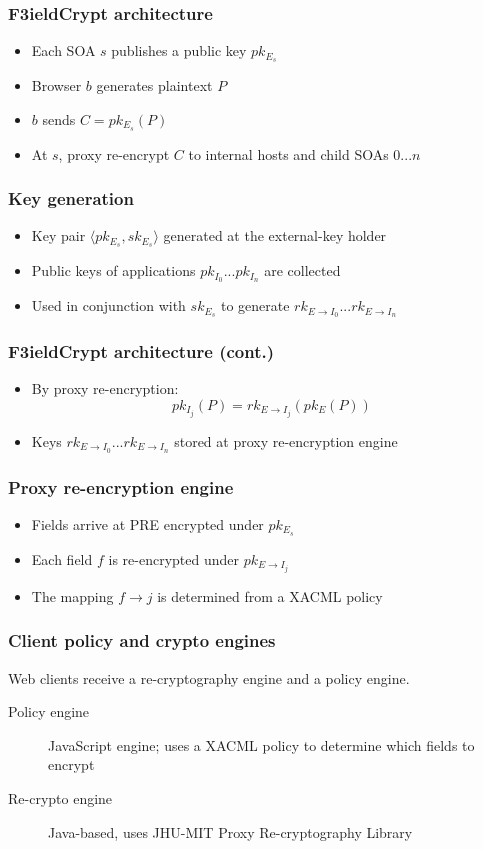\documentclass{beamer}
\begin{document}
\begin{frame}
\frametitle{F3ieldCrypt architecture}
\begin{itemize}
\item Each SOA $s$ publishes a public key $pk_{E_s}$
\item Browser $b$ generates plaintext $P$
\item $b$ sends $C = pk_{E_s}(P)$ 
\item At $s$, proxy re-encrypt $C$ to internal hosts and child SOAs $0...n$ 
\end{itemize}
\end{frame}

\begin{frame}
\frametitle{Key generation}
\begin{itemize}
\item Key pair $\langle pk_{E_s}, sk_{E_s} \rangle$ generated at the
\alert{external-key holder}
\item Public keys of applications $pk_{I_0}...pk_{I_n}$ are collected
\item Used in conjunction with $sk_{E_s}$ to generate $rk_{E \to I_0}...rk_{E
\to I_n}$
\end{itemize}
\end{frame}

\begin{frame}
\frametitle{F3ieldCrypt architecture (cont.)}
\begin{itemize}
\item By proxy re-encryption:
\begin{equation*}
pk_{I_j}(P) = rk_{E \to I_j}( pk_E (P))
\end{equation*}
\item Keys $rk_{E \to I_0}...rk_{E \to I_n}$ stored at \alert{proxy
re-encryption engine}
\end{itemize}
\end{frame}

\begin{frame}
\frametitle{Proxy re-encryption engine}
\begin{itemize}
\item Fields arrive at PRE encrypted under $pk_{E_s}$
\item Each field $f$ is re-encrypted under $pk_{E \to I_j}$
\item The mapping $f \to j$ is determined from a XACML policy
\end{itemize}
\end{frame}

\begin{frame}
\frametitle{Client policy and crypto engines}
Web clients receive a re-cryptography engine and a policy engine. 
\medskip
\begin{description}
\item[Policy engine] JavaScript engine; uses a XACML policy to determine which
fields to encrypt
\item[Re-crypto engine] Java-based, uses JHU-MIT Proxy Re-cryptography Library
\end{description}
\end{frame}
\end{document}

